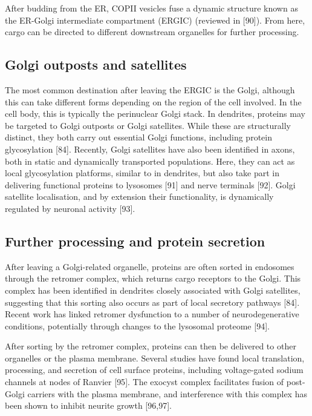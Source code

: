 \documentclass[
  12pt,
  a4paper,
]{book}
\begin{document}
After budding from the ER, COPII vesicles fuse a dynamic structure known as the ER-Golgi intermediate compartment (ERGIC) (reviewed in {[}90{]}). From here, cargo can be directed to different downstream organelles for further processing.

\hypertarget{golgi-outposts-and-satellites}{%
\subsection{Golgi outposts and satellites}\label{golgi-outposts-and-satellites}}

The most common destination after leaving the ERGIC is the Golgi, although this can take different forms depending on the region of the cell involved. In the cell body, this is typically the perinuclear Golgi stack. In dendrites, proteins may be targeted to Golgi outposts or Golgi satellites. While these are structurally distinct, they both carry out essential Golgi functions, including protein glycosylation {[}84{]}. Recently, Golgi satellites have also been identified in axons, both in static and dynamically transported populations. Here, they can act as local glycosylation platforms, similar to in dendrites, but also take part in delivering functional proteins to lysosomes {[}91{]} and nerve terminals {[}92{]}. Golgi satellite localisation, and by extension their functionality, is dynamically regulated by neuronal activity {[}93{]}.

\hypertarget{further-processing-and-protein-secretion}{%
\subsection{Further processing and protein secretion}\label{further-processing-and-protein-secretion}}

After leaving a Golgi-related organelle, proteins are often sorted in endosomes through the retromer complex, which returns cargo receptors to the Golgi. This complex has been identified in dendrites closely associated with Golgi satellites, suggesting that this sorting also occurs as part of local secretory pathways {[}84{]}. Recent work has linked retromer dysfunction to a number of neurodegenerative conditions, potentially through changes to the lysosomal proteome {[}94{]}.

After sorting by the retromer complex, proteins can then be delivered to other organelles or the plasma membrane. Several studies have found local translation, processing, and secretion of cell surface proteins, including voltage-gated sodium channels at nodes of Ranvier {[}95{]}. The exocyst complex facilitates fusion of post-Golgi carriers with the plasma membrane, and interference with this complex has been shown to inhibit neurite growth {[}96,97{]}.
\end{document}
